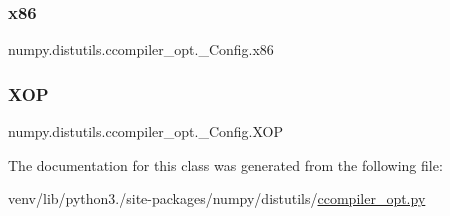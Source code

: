 \subsubsection{\texorpdfstring{x86}{x86}}
{\footnotesize\ttfamily numpy.\+distutils.\+ccompiler\+\_\+opt.\+\_\+\+Config.\+x86\hspace{0.3cm}{\ttfamily [static]}}

\mbox{\label{classnumpy_1_1distutils_1_1ccompiler__opt_1_1__Config_a08ba3fce5a3b1620d98720f5f74513ef}} 
\subsubsection{\texorpdfstring{X\+OP}{XOP}}
{\footnotesize\ttfamily numpy.\+distutils.\+ccompiler\+\_\+opt.\+\_\+\+Config.\+X\+OP\hspace{0.3cm}{\ttfamily [static]}}



The documentation for this class was generated from the following file\+:\begin{DoxyCompactItemize}
\item 
venv/lib/python3./site-\/packages/numpy/distutils/\hyperlink{ccompiler__opt_8py}{ccompiler\+\_\+opt.\+py}\end{DoxyCompactItemize}

